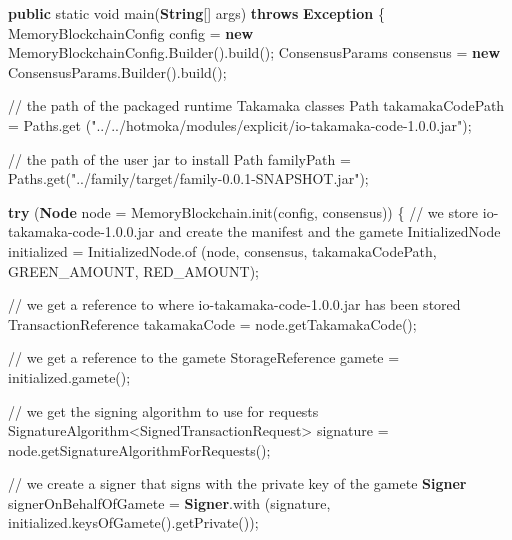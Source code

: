 \documentclass[a4paper,]{book}
\newenvironment{Shaded}{\begin{snugshade}}{\end{snugshade}}
\newcommand{\BuiltInTok}[1]{\textcolor[rgb]{0.39,0.29,0.61}{\textbf{#1}}}
\newcommand{\CommentTok}[1]{\textcolor[rgb]{0.54,0.53,0.53}{#1}}
\newcommand{\DataTypeTok}[1]{\textcolor[rgb]{0.00,0.34,0.68}{#1}}
\newcommand{\FunctionTok}[1]{\textcolor[rgb]{0.39,0.29,0.61}{#1}}
\newcommand{\KeywordTok}[1]{\textcolor[rgb]{0.12,0.11,0.11}{\textbf{#1}}}
\newcommand{\NormalTok}[1]{\textcolor[rgb]{0.12,0.11,0.11}{#1}}
\newcommand{\StringTok}[1]{\textcolor[rgb]{0.75,0.01,0.01}{#1}}
\renewenvironment{Shaded}{\begin{snugshade}\small}{\end{snugshade}}
\begin{document}
{\begin{Shaded}
\begin{Highlighting}[]
  \KeywordTok{public} \DataTypeTok{static} \DataTypeTok{void} \FunctionTok{main}\NormalTok{(}\BuiltInTok{String}\NormalTok{[] args) }\KeywordTok{throws} \BuiltInTok{Exception}\NormalTok{ \{}
\NormalTok{    MemoryBlockchainConfig config = }\KeywordTok{new}\NormalTok{ MemoryBlockchainConfig.}\FunctionTok{Builder}\NormalTok{().}\FunctionTok{build}\NormalTok{();}
\NormalTok{    ConsensusParams consensus = }\KeywordTok{new}\NormalTok{ ConsensusParams.}\FunctionTok{Builder}\NormalTok{().}\FunctionTok{build}\NormalTok{();}

    \CommentTok{// the path of the packaged runtime Takamaka classes}
\NormalTok{    Path takamakaCodePath = Paths.}\FunctionTok{get}
\NormalTok{      (}\StringTok{"../../hotmoka/modules/explicit/io-takamaka-code-1.0.0.jar"}\NormalTok{);}

    \CommentTok{// the path of the user jar to install}
\NormalTok{    Path familyPath = Paths.}\FunctionTok{get}\NormalTok{(}\StringTok{"../family/target/family-0.0.1-SNAPSHOT.jar"}\NormalTok{);}

    \KeywordTok{try}\NormalTok{ (}\BuiltInTok{Node}\NormalTok{ node = MemoryBlockchain.}\FunctionTok{init}\NormalTok{(config, consensus)) \{}
      \CommentTok{// we store io-takamaka-code-1.0.0.jar and create the manifest and the gamete}
\NormalTok{      InitializedNode initialized = InitializedNode.}\FunctionTok{of}
\NormalTok{        (node, consensus, takamakaCodePath, GREEN_AMOUNT, RED_AMOUNT);}

      \CommentTok{// we get a reference to where io-takamaka-code-1.0.0.jar has been stored}
\NormalTok{      TransactionReference takamakaCode = node.}\FunctionTok{getTakamakaCode}\NormalTok{();}

      \CommentTok{// we get a reference to the gamete}
\NormalTok{      StorageReference gamete = initialized.}\FunctionTok{gamete}\NormalTok{();}

      \CommentTok{// we get the signing algorithm to use for requests}
\NormalTok{      SignatureAlgorithm<SignedTransactionRequest> signature}
\NormalTok{        = node.}\FunctionTok{getSignatureAlgorithmForRequests}\NormalTok{();}

      \CommentTok{// we create a signer that signs with the private key of the gamete}
      \BuiltInTok{Signer}\NormalTok{ signerOnBehalfOfGamete = }\BuiltInTok{Signer}\NormalTok{.}\FunctionTok{with}
\NormalTok{        (signature, initialized.}\FunctionTok{keysOfGamete}\NormalTok{().}\FunctionTok{getPrivate}\NormalTok{());}


\end{Highlighting}
\end{Shaded}}
\end{document}
